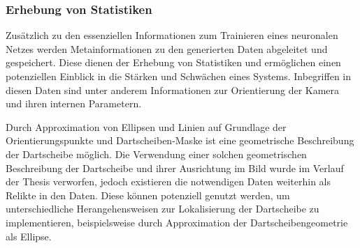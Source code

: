 \subsubsection{Erhebung von Statistiken}

Zusätzlich zu den essenziellen Informationen zum Trainieren eines neuronalen Netzes werden Metainformationen zu den generierten Daten abgeleitet und gespeichert. Diese dienen der Erhebung von Statistiken und ermöglichen einen potenziellen Einblick in die Stärken und Schwächen eines Systems.
Inbegriffen in diesen Daten sind unter anderem Informationen zur Orientierung der Kamera und ihren internen Parametern.

Durch Approximation von Ellipsen und Linien auf Grundlage der Orientierungspunkte und Dartscheiben-Maske ist eine geometrische Beschreibung der Dartscheibe möglich. Die Verwendung einer solchen geometrischen Beschreibung der Dartscheibe und ihrer Ausrichtung im Bild wurde im Verlauf der Thesis verworfen, jedoch existieren die notwendigen Daten weiterhin als Relikte in den Daten. Diese können potenziell genutzt werden, um unterschiedliche Herangehensweisen zur Lokalisierung der Dartscheibe zu implementieren, beispielsweise durch Approximation der Dartscheibengeometrie als Ellipse.

